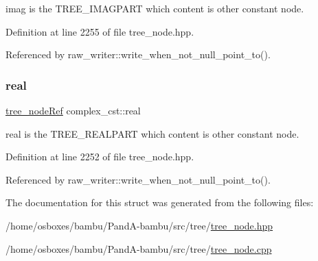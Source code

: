 imag is the T\+R\+E\+E\+\_\+\+I\+M\+A\+G\+P\+A\+RT which content is other constant node. 



Definition at line 2255 of file tree\+\_\+node.\+hpp.



Referenced by raw\+\_\+writer\+::write\+\_\+when\+\_\+not\+\_\+null\+\_\+point\+\_\+to().

\mbox{\label{structcomplex__cst_a6aa984499212d39509ae3cec0f8d4512}} 
\subsubsection{\texorpdfstring{real}{real}}
{\footnotesize\ttfamily \hyperlink{tree__node_8hpp_a6ee377554d1c4871ad66a337eaa67fd5}{tree\+\_\+node\+Ref} complex\+\_\+cst\+::real}



real is the T\+R\+E\+E\+\_\+\+R\+E\+A\+L\+P\+A\+RT which content is other constant node. 



Definition at line 2252 of file tree\+\_\+node.\+hpp.



Referenced by raw\+\_\+writer\+::write\+\_\+when\+\_\+not\+\_\+null\+\_\+point\+\_\+to().



The documentation for this struct was generated from the following files\+:\begin{DoxyCompactItemize}
\item 
/home/osboxes/bambu/\+Pand\+A-\/bambu/src/tree/\hyperlink{tree__node_8hpp}{tree\+\_\+node.\+hpp}\item 
/home/osboxes/bambu/\+Pand\+A-\/bambu/src/tree/\hyperlink{tree__node_8cpp}{tree\+\_\+node.\+cpp}\end{DoxyCompactItemize}

